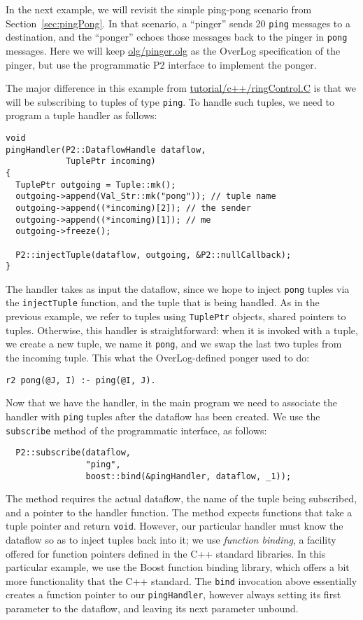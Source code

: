 \documentclass{article}
\begin{document}
In the next example, we will revisit the simple ping-pong scenario from
Section~\ref{sec:pingPong}. In that scenario, a ``pinger'' sends 20
\lstinline$ping$ messages to a destination, and the ``ponger'' echoes
those messages back to the pinger in \lstinline$pong$ messages.  Here we
will keep \url{olg/pinger.olg} as the OverLog specification of the
pinger, but use the programmatic P2 interface to implement the ponger.

The major difference in this example from
\url{tutorial/c++/ringControl.C} is that we will be subscribing to
tuples of type \lstinline$ping$.  To handle such tuples, we need to
program a tuple handler as follows:
\begin{verbatim}
void
pingHandler(P2::DataflowHandle dataflow,
            TuplePtr incoming)
{
  TuplePtr outgoing = Tuple::mk();
  outgoing->append(Val_Str::mk("pong")); // tuple name
  outgoing->append((*incoming)[2]); // the sender
  outgoing->append((*incoming)[1]); // me
  outgoing->freeze();

  P2::injectTuple(dataflow, outgoing, &P2::nullCallback);
}
\end{verbatim}
The handler takes as input the dataflow, since we hope to inject
\lstinline$pong$ tuples via the \texttt{injectTuple} function, and the
tuple that is being handled. As in the previous example, we refer to
tuples using \texttt{TuplePtr} objects, shared pointers to
tuples. Otherwise, this handler is straightforward: when it is invoked
with a tuple, we create a new tuple, we name it \lstinline$pong$, and we
swap the last two tuples from the incoming tuple. This what the
OverLog-defined ponger used to do:
\begin{lstlisting}
r2 pong(@J, I) :- ping(@I, J).
\end{lstlisting}

Now that we have the handler, in the main program we need to associate
the handler with \lstinline$ping$ tuples after the dataflow has been
created. We use the \texttt{subscribe} 
method of the programmatic interface, as follows:
\begin{verbatim}
  P2::subscribe(dataflow,
                "ping",
                boost::bind(&pingHandler, dataflow, _1));
\end{verbatim}
The method requires the actual dataflow, the name of the tuple being
subscribed, and a pointer to the handler function.  The method expects
functions that take a tuple pointer and return \texttt{void}. However,
our particular handler must know the dataflow so as to inject tuples
back into it; we use \emph{function binding}, a facility offered for
function pointers defined in the C++ standard libraries. In this
particular example, we use the Boost function binding library, which
offers a bit more functionality that the C++ standard.  The
\texttt{bind} invocation above essentially creates a function pointer to
our \texttt{pingHandler}, however always setting its first parameter to
the dataflow, and leaving its next parameter unbound.
\end{document}
